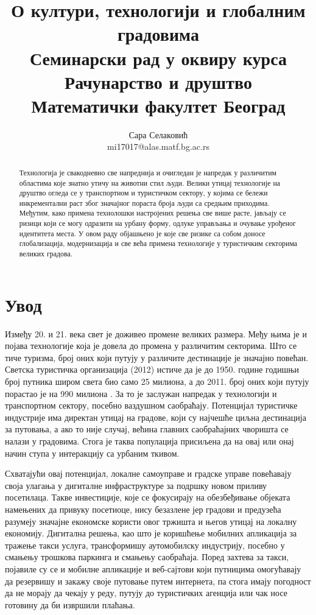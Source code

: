 \documentclass{article}
\title{О култури, технологији и глобалним градовима\\
    \small{Семинарски рад у оквиру курса\\Рачунарство и друштво\\Математички факултет Београд}}
\author{Сара Селаковић\\mi17017@alas.matf.bg.ac.rs}
\begin{document}
\maketitle

\begin{abstract}
Технологија је свакодневно све напреднија и очигледан је напредак у различитим областима које знатно утичу на животни стил људи. Велики утицај технологије на друштво огледа се у транспортном и туристичком сектору, у којима се бележи инкрементални раст због значајног пораста броја људи са средњим приходима. Међутим, како примена технолошки настројених решења све више расте, јављају се ризици који се могу одразити на урбану форму, одлуке управљања и очување урођеног идентитета места. У овом раду објашњено је које све ризике са собом доносе глобализација, модернизација и све већа примена технологије у туристичким секторима великих градова.

\end{abstract}

\newpage
\tableofcontents
\newpage

\section{Увод}

Између 20. и 21. века свет је доживео промене великих размера. Међу њима је и појава технологије која је довела до промена у различитим секторима. Што се тиче туризма, број оних који путују у различите дестинације је значајно повећан. Светска туристичка организација (2012) истиче да је до 1950. године годишњи број путника широм света био само 25 милиона, а до 2011. број оних који путују порастао је на 990 милиона \cite{wto}. За то је заслужан напредак у технологији и транспортном сектору, посебно ваздушном саобраћају. Потенцијал туристичке индустрије има директан утицај на градове, који су најчешће циљна дестинација за путовања, а ако то није случај, већина главних саобраћајних чворишта се налази у градовима. Стога је таква популација присиљена да на овај или онај начин ступа у интеракцију са урбаним ткивом.

Схватајући овај потенцијал, локалне самоуправе и градске управе повећавају своја улагања у дигиталне инфраструктуре за подршку новом приливу посетилаца. Такве инвестиције, које се фокусирају на обезбеђивање објеката намењених да привуку посетиоце, нису безазлене јер градови и предузећа разумеју значајне економске користи овог тржишта и његов утицај на локалну економију. Дигитална решења, као што је коришћење мобилних апликација за тражење такси услуга, трансформишу аутомобилску индустрију, посебно у смањењу трошкова паркинга и смањењу саобраћаја. Поред захтева за такси, појавиле су се и мобилне апликације и веб-сајтови који путницима омогућавају да резервишу и закажу своје путовање путем интернета, па стога имају погодност да не морају да чекају у реду, путују до туристичких агенција или чак носе готовину да би извршили плаћања.
\end{document}
